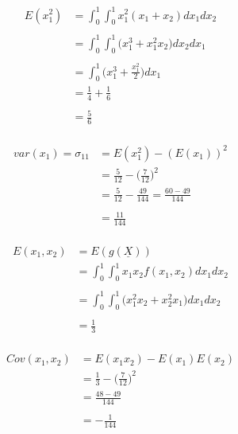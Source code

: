 \documentclass[11pt,a4paper]{article}
\theoremstyle{definition}
\begin{document}
\begin{enumerate}
\begin{align*}
E(x^2_1) & = \int^1_0\int^1_0 x^2_1(x_1+x_2)dx_1dx_2\\\\
         & = \int^1_0\int^1_0 \big(x^3_1+x_1^2x_2\big)dx_2dx_1\\\\
         & = \int^1_0 \big(x^3_1 + \frac{x^2_1}{2}\big) dx_1\\
         & = \frac{1}{4}+ \frac{1}{6}\\\\
         & = \frac{5}{6}\\
\end{align*}







\begin{align*}
var(x_1) = \sigma_{11}  & = E(x_1^2) - (E(x_1))^2\\
                        & = \frac{5}{12}-\Big(\frac{7}{12}\Big)^2\\
                        & = \frac{5}{12}-\frac{49}{144}=\frac{60-49}{144}\\\\
                        & = \frac{11}{144}\\
\end{align*}



\begin{align*}
E(x_1,x_2) & = E(g(\underline{X}))\\
           &  = \int^1_0 \int^1_0 x_1x_2 f(x_1,x_2)dx_1dx_2\\\\
           & = \int^1_0\int^1_0\big(x^2_1x_2 + x^2_2x_1\big)dx_1dx_2\\\\
           & = \frac{1}{3}\\
\end{align*}



\begin{align*}
Cov(x_1,x_2) & = E(x_1 x_2) - E(x_1)E(x_2)\\
             & = \frac{1}{3}-\Big(\frac{7}{12}\Big)^2\\
             & = \frac{48-49}{144}\\\\
             & = -\frac{1}{144}\\
\end{align*}




\end{enumerate}
\end{document}
